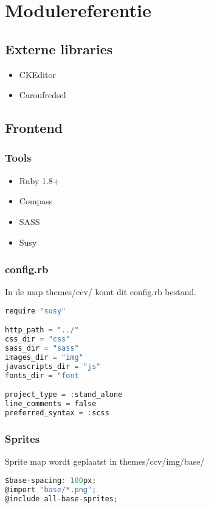 \section{Modulereferentie}\label{tools}

\begin{multicols}{2}

\end{multicols}

\subsection{Externe libraries}

\begin{itemize}
 \item CKEditor
 \item Caroufredsel
\end{itemize}

\subsection{Frontend}

\subsubsection{Tools}
\begin{itemize}
 \item Ruby 1.8+
 \item Compass
 \item SASS
 \item Susy
\end{itemize}

\subsubsection{config.rb}
In de map themes/ccv/ komt dit config.rb bestand.
\begin{lstlisting}[language=C]
require "susy"

http_path = "../"
css_dir = "css"
sass_dir = "sass"
images_dir = "img"
javascripts_dir = "js"
fonts_dir = "font

project_type = :stand_alone
line_comments = false
preferred_syntax = :scss
 \end{lstlisting}
 
\subsubsection{Sprites}
Sprite map wordt geplaatst in themes/ccv/img/base/
\begin{lstlisting}[language=C]
$base-spacing: 100px;
@import "base/*.png";
@include all-base-sprites;
 \end{lstlisting}
 
